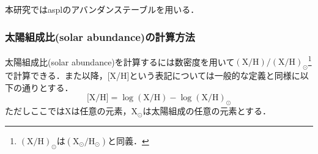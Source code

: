 本研究ではasplのアバンダンステーブルを用いる．

\subsubsection{太陽組成比(solar abundance)の計算方法}
太陽組成比(solar abundance)を計算するには数密度を用いて$(\text{X/H})/(\text{X/H})_\odot$\footnote{$(\text{X/H})_\odot$は$(\text{X}_\odot/\text{H}_\odot)$と同義．}で計算できる．また以降，[X/H]という表記については一般的な定義と同様に以下の通りとする．
\begin{equation}
	\text{[X/H]} = \log(\text{X/H}) - \log(\text{X/H})_\odot
\end{equation}
ただしここではXは任意の元素，X$_\odot$は太陽組成の任意の元素とする．